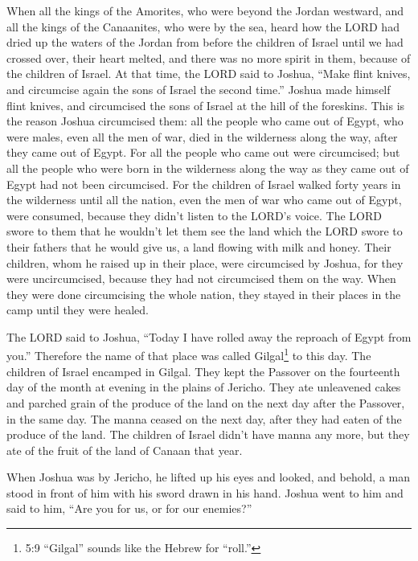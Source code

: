 \mychapter{} \myverse*{}When all the kings of the Amorites, who were beyond the Jordan
westward, and all the kings of the Canaanites, who were by the sea, heard how the LORD had dried up the
waters of the Jordan from before the children of Israel until we had crossed over, their heart melted,
and there was no more spirit in them, because of the children of Israel.
\myverse{}At that time, the LORD said to Joshua, “Make flint knives, and circumcise again
the sons of Israel the second time.”
\myverse{}Joshua made himself flint knives, and circumcised the sons of Israel at the
hill of the foreskins.
\myverse{}This is the reason Joshua circumcised them: all the people who came out of Egypt,
who were males, even all the men of war, died in the wilderness along the way, after they came out of
Egypt.
\myverse{}For all the people who came out were circumcised; but all the people who were
born in the wilderness along the way as they came out of Egypt had not been circumcised.
\myverse{}For the children of Israel walked forty years in the wilderness until all the
nation, even the men of war who came out of Egypt, were consumed, because they didn’t listen to the LORD’s
voice. The LORD swore to them that he wouldn’t let them see the land which the LORD swore to their fathers
that he would give us, a land flowing with milk and honey.
\myverse{}Their children, whom he raised up in their place, were circumcised by Joshua,
for they were uncircumcised, because they had not circumcised them on the way.
\myverse{}When they were done circumcising the whole nation, they stayed in their places
in the camp until they were healed.

\myverse{}The LORD said to Joshua, “Today I have rolled away the reproach
of Egypt from you.” Therefore the name of that place was called Gilgal\footnote{5:9 “Gilgal” sounds like the Hebrew for “roll.”} to this day.
\myverse{}The children of Israel encamped in Gilgal. They kept the Passover on the fourteenth
day of the month at evening in the plains of Jericho.
\myverse{}They ate unleavened cakes and parched grain of the produce of the land on
the next day after the Passover, in the same day.
\myverse{}The manna ceased on the next day, after they had eaten of the produce of the
land. The children of Israel didn’t have manna any more, but they ate of the fruit of the land of Canaan
that year.

\myverse{}When Joshua was by Jericho, he lifted up his eyes and looked,
and behold, a man stood in front of him with his sword drawn in his hand. Joshua went to him and said
to him, “Are you for us, or for our enemies?”

